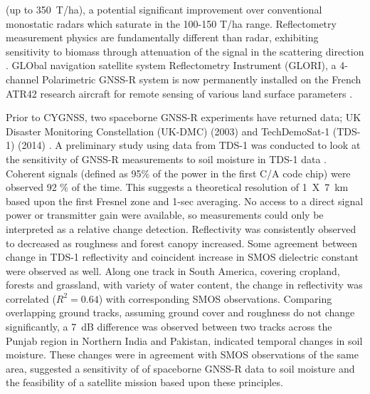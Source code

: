 \documentclass[draftcls,onecolumn]{IEEEtran}  %
\begin{document}
(up to 350~T/ha), a potential significant improvement over conventional monostatic radars which saturate in the 100-150 T/ha range.  
Reflectometry measurement physics are fundamentally different than radar, exhibiting sensitivity to biomass through attenuation of the signal in the scattering direction \cite{Egido2014}.
GLObal navigation satellite system Reflectometry Instrument (GLORI), a 4-channel Polarimetric GNSS-R system is now permanently installed on the French ATR42 research aircraft for remote sensing of various land surface parameters \cite{Motte2016}.


Prior to CYGNSS, two spaceborne GNSS-R experiments have returned data; UK Disaster Monitoring Constellation (UK-DMC) (2003) \cite{Gleason2005} and
TechDemoSat-1 (TDS-1) (2014) \cite{Unwin2016}. 
A preliminary study using data from TDS-1 was conducted to look at the sensitivity of GNSS-R measurements to soil moisture in TDS-1 data \cite{Chew2016}.
Coherent signals (defined as 95\% of the power in the first C/A code chip) were observed  92 \% of the time.  
This suggests a theoretical resolution of 1~X~7~km  based upon the first Fresnel zone and 1-sec averaging.
No access to a direct signal power or transmitter gain were available, so measurements could only be interpreted as a relative change detection. 
Reflectivity was consistently observed to decreased as roughness and forest canopy increased. 
Some agreement between change in TDS-1 reflectivity and coincident increase in SMOS dielectric constant were observed as well.
Along one track in South America, covering cropland, forests and grassland, with variety of water content, the change in reflectivity was correlated ($R^2=0.64$) 
with corresponding  SMOS observations.
Comparing overlapping ground tracks, assuming ground cover and roughness do not change significantly, 
a 7~dB difference was observed between two tracks across the 
Punjab region in Northern India and Pakistan,  indicated temporal changes in soil moisture.
These changes were in agreement with SMOS observations of the same area, 
suggested a sensitivity of of spaceborne GNSS-R data to soil moisture and the feasibility of a satellite mission based upon these principles. 
\end{document}
